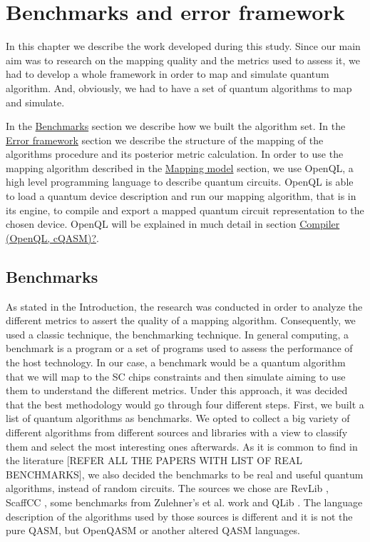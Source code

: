 
\chapter*{Benchmarks and error framework}
\label{sec:org2412e1b}

In this chapter we describe the work developed during this study.
Since our main aim was to research on the mapping quality and the metrics used to assess it, we had to develop a whole framework in order to map and simulate quantum algorithm.
And, obviously, we had to have a set of quantum algorithms to map and simulate.

In the \hyperref[sec:org1f34af7]{Benchmarks} section we describe how we built the algorithm set.
In the \hyperref[sec:orgba78ae7]{Error framework} section we describe the structure of the mapping of the algorithms procedure and its posterior metric calculation.
In order to use the mapping algorithm described in the \href{chapter-3.org}{Mapping model} section, we use OpenQL, a high level programming language to describe quantum circuits.
OpenQL is able to load a quantum device description and run our mapping algorithm, that is in its engine, to compile and export a mapped quantum circuit representation to the chosen device.
OpenQL will be explained in much detail in section \hyperref[sec:org53e0a74]{Compiler (OpenQL, cQASM)?}.

\section*{Benchmarks}
\label{sec:org1f34af7}
As stated in the Introduction, the research was conducted in order to analyze the different metrics to assert the quality of a mapping algorithm.
Consequently, we used a classic technique, the benchmarking technique.
In general computing, a benchmark is a program or a set of programs used to assess the performance of the host technology.
In our case, a benchmark would be a quantum algorithm that we will map to the SC chips constraints and then simulate aiming to use them to understand the different metrics.
Under this approach, it was decided that the best methodology would go through four different steps.
First, we built a list of quantum algorithms as benchmarks.
We opted to collect a big variety of different algorithms from different sources and libraries with a view to classify them and select the most interesting ones afterwards.
As it is common to find in the literature [REFER ALL THE PAPERS WITH LIST OF REAL BENCHMARKS], we also decided the benchmarks to be real and useful quantum algorithms, instead of random circuits.
The sources we chose are RevLib \cite{Wille_2008}, ScaffCC \cite{JavadiAbhari_2015}, some benchmarks from Zulehner's et al. work \cite{zulehner17:effic_method_mappin_quant_circuit} and QLib \cite{Lin_2014}.
The language description of the algorithms used by those sources is different and it is not the pure QASM, but OpenQASM or another altered QASM languages.


